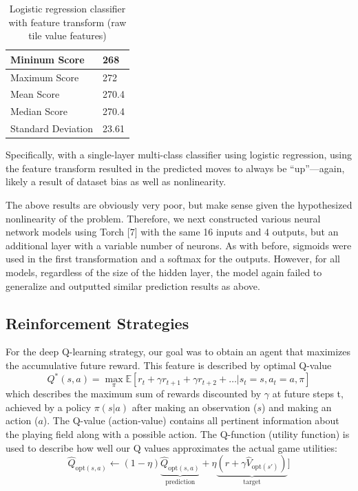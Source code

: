 \documentclass[9pt,twocolumn]{article}
\begin{document}
\begin{table}[!htbp]

\centering

\begin{tabular}{|l|l|}
\hline
Mininum Score      & 268 \\ \hline
Maximum Score      & 272 \\ \hline
Mean Score         & 270.4 \\ \hline
Median Score       & 270.4 \\ \hline
Standard Deviation & 23.61 \\ \hline
\end{tabular}

\caption{Logistic regression classifier with feature transform (raw tile value features)}

\end{table}

Specifically, with a single-layer multi-class classifier using logistic regression, using the feature transform resulted in the predicted moves to always be “up”---again, likely a result of dataset bias as well as nonlinearity.

The above results are obviously very poor, but make sense given the hypothesized nonlinearity of the problem. Therefore, we next constructed various neural network models using Torch [7] with the same 16 inputs and 4 outputs, but an additional layer with a variable number of neurons. As with before, sigmoids were used in the first transformation and a softmax for the outputs. However, for all models, regardless of the size of the hidden layer, the model again failed to generalize and outputted similar prediction results as above.

\subsection{Reinforcement Strategies}

For the deep Q-learning strategy, our goal was to obtain an agent that maximizes the accumulative future reward. This feature is described by optimal Q-value $$Q^*(s, a) = \max_{\pi} \mathbb{E} [r_t + \gamma r_{t + 1} + \gamma r_{t + 2} + \dots | s_t = s, a_t = a, \pi]$$ which describes the maximum sum of rewards discounted by $\gamma$ at future steps t, achieved by a policy $\pi(s|a)$ after making an observation ($s$) and making an action ($a$). The Q-value (action-value) contains all pertinent information about the playing field along with a possible action. The Q-function (utility function) is used to describe how well our Q values approximates the actual game utilities: $$\hat Q_{\text{opt}(s, a)} \leftarrow (1-\eta) \underbrace{\hat Q_{\text{opt}(s, a)}}_\text{prediction} + \eta \underbrace{(r + \gamma \hat V_{\text{opt}(s')})}_\text{target}]$$
\end{document}
